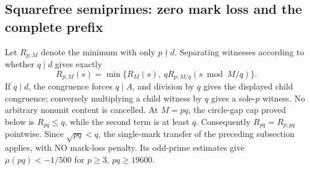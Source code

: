 \documentclass[11pt]{article}
\theoremstyle{definition}\newtheorem{definition}[theorem]{Definition}
\theoremstyle{remark}\newtheorem{remark}[theorem]{Remark}
\begin{document}
\subsection{Squarefree semiprimes: zero mark loss and the complete prefix}
\label{ap:finite:squarefree}

Let \(R_{p;M}\) denote the minimum with only \(p\nmid d\).
Separating witnesses according to whether \(q\mid d\) gives exactly
\[
 R_{p;M}(s)=\min\{R_M(s),\
                 qR_{p;M/q}(s\bmod M/q)\}.
\]
If \(q\mid d\), the congruence forces \(q\mid A\), and division by \(q\)
gives the displayed child congruence; conversely multiplying a child
witness by \(q\) gives a sole-\(p\) witness.  No arbitrary nonunit
content is cancelled.  At \(M=pq\), the circle-gap cap proved below
is \(R_{pq}\le q\), while the second term is at least \(q\).
Consequently \(R_{pq}=R_{p;pq}\) pointwise.
Since \(\sqrt{pq}<q\), the single-mark transfer of the preceding
subsection applies, with NO mark-loss penalty.  Its odd-prime
estimates give \(\mu(pq)<-1/500\) for \(p\ge3\), \(pq\ge19600\).
\end{document}
